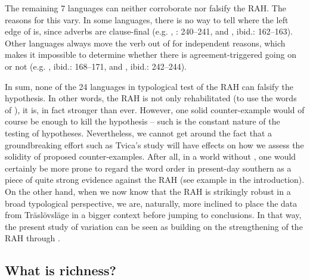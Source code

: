 \documentclass[output=paper,colorlinks,citecolor=brown,draft,draftmode]{langscibook}
\begin{document}
The remaining 7 languages can neither corroborate nor falsify the RAH. The reasons for this vary. In some languages, there is no way to tell where the left edge of  is, since adverbs are clause-final (e.g. , \citealt{Tvica2017}: 240–241, and , ibid.: 162–163). Other languages always move the verb out of  for independent reasons, which makes it impossible to determine whether there is agreement-triggered  going on or not (e.g. , ibid.: 168–171, and , ibid.: 242–244).



In sum, none of the 24 languages in  typological test of the RAH can falsify the hypothesis. In other words, the RAH is not only rehabilitated (to use the words of \citealt{KoenemanZeijlstra2014}), it is, in fact stronger than ever. However, one solid counter-example would of course be enough to kill the hypothesis – such is the constant nature of the testing of hypotheses. Nevertheless, we cannot get around the fact that a groundbreaking effort such as Tvica’s study will have effects on how we assess the solidity of proposed counter-examples. After all, in a world without \citet{Tvica2017}, one would certainly be more prone to regard the  word order in present-day southern  as a piece of quite strong evidence against the RAH (see example  in the introduction). On the other hand, when we now know that the RAH is strikingly robust in a broad typological perspective, we are, naturally, more inclined to place the data from Träslövsläge in a bigger context before jumping to conclusions. In that way, the present study of  variation can be seen as building on the strengthening of the RAH through \citet{Tvica2017}.


\subsection{What is richness?}\label{sec:petzell:4.2}
\end{document}
